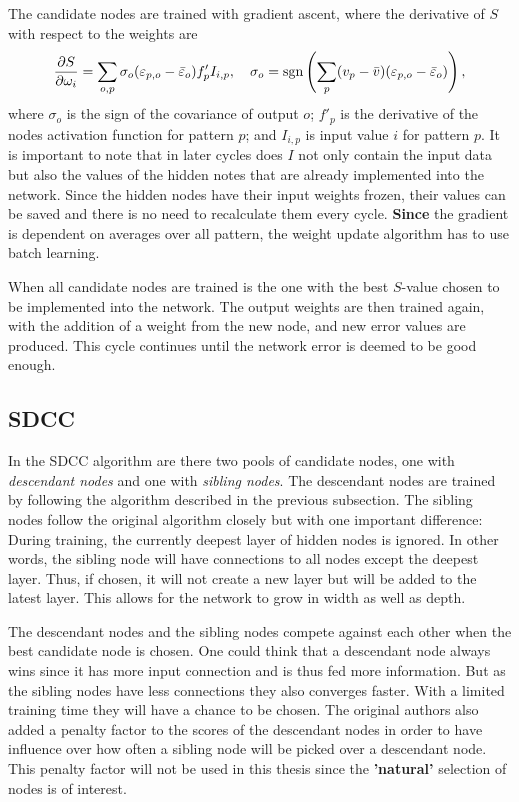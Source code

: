 \documentclass[a4paper,11pt, usenatbib]{article}
\begin{document}
The candidate nodes are trained with gradient ascent, where the derivative of $S$ with respect to the weights are
\begin{equation}
\label{eq:CorrDer}
    \frac{\partial S}{\partial \omega_i}=\sum_{o,p}\sigma_o(\varepsilon_{p, o}-\bar{\varepsilon}_{o})f'_pI_{i,p},\quad \sigma_o=\textnormal{sgn}\left(\sum_p(v_p-\Bar{v})(\varepsilon_{p, o}-\bar{\varepsilon}_{o})\right),
\end{equation}
where $\sigma_o$ is the sign of the covariance of output $o$; $f'_p$ is the derivative of the nodes activation function for pattern $p$; and $I_{i, p}$ is input value $i$ for pattern $p$. It is important to note that in later cycles does $I$ not only contain the input data but also the values of the hidden notes that are already implemented into the network. Since the hidden nodes have their input weights frozen, their values can be saved and there is no need to recalculate them every cycle. \textbf{Since} the gradient is dependent on averages over all pattern, the weight update algorithm has to use batch learning. 

When all candidate nodes are trained is the one with the best $S$-value chosen to be implemented into the network. The output weights are then trained again, with the addition of a weight from the new node, and new error values are produced. This cycle continues until the network error is deemed to be good enough. 

\subsection{SDCC}
\label{ssec:SDCC}
In the SDCC algorithm are there two pools of candidate nodes, one with \textit{descendant nodes} and one with \textit{sibling nodes}. The descendant nodes are trained by following the algorithm described in the previous subsection. The sibling nodes follow the original algorithm closely but with one important difference: During training, the currently deepest layer of hidden nodes is ignored. In other words, the sibling node will have connections to all nodes except the deepest layer. Thus, if chosen, it will not create a new layer but will be added to the latest layer. This allows for the network to grow in width as well as depth. 

The descendant nodes and the sibling nodes compete against each other when the best candidate node is chosen. One could think that a descendant node always wins since it has more input connection and is thus fed more information. But as the sibling nodes have less connections they also converges faster. With a limited training time they will have a chance to be chosen. The original authors \cite{baluja_reducing_1994} also added a penalty factor to the scores of the descendant nodes in order to have influence over how often a sibling node will be picked over a descendant node. This penalty factor will not be used in this thesis since the \textbf{'natural'} selection of nodes is of interest. 
\end{document}
